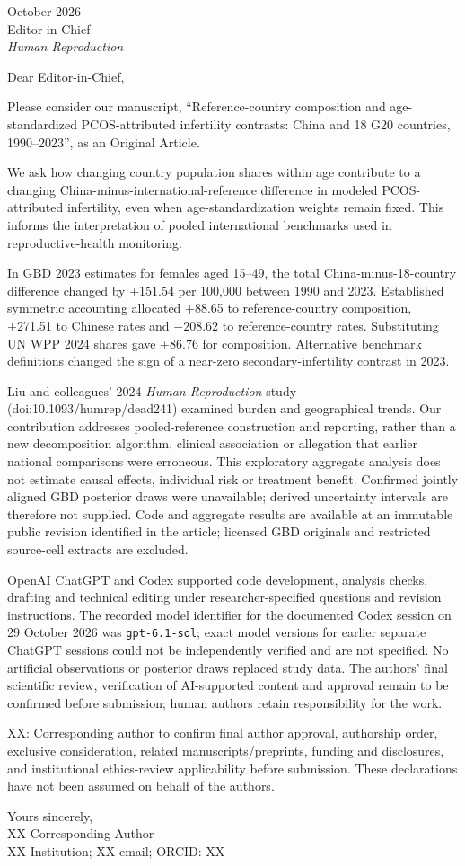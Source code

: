 \documentclass[11pt,a4paper]{article}
\begin{document}
 October 2026\\
Editor-in-Chief\\
\emph{Human Reproduction}

Dear Editor-in-Chief,

Please consider our manuscript, ``Reference-country composition and age-standardized PCOS-attributed infertility contrasts: China and 18 G20 countries, 1990--2023'', as an Original Article.

We ask how changing country population shares within age contribute to a changing China-minus-international-reference difference in modeled PCOS-attributed infertility, even when age-standardization weights remain fixed. This informs the interpretation of pooled international benchmarks used in reproductive-health monitoring.

In GBD 2023 estimates for females aged 15--49, the total China-minus-18-country difference changed by +151.54 per 100,000 between 1990 and 2023. Established symmetric accounting allocated +88.65 to reference-country composition, +271.51 to Chinese rates and $-208.62$ to reference-country rates. Substituting UN WPP 2024 shares gave +86.76 for composition. Alternative benchmark definitions changed the sign of a near-zero secondary-infertility contrast in 2023.

Liu and colleagues' 2024 \emph{Human Reproduction} study (doi:10.1093/humrep/dead241) examined burden and geographical trends. Our contribution addresses pooled-reference construction and reporting, rather than a new decomposition algorithm, clinical association or allegation that earlier national comparisons were erroneous. This exploratory aggregate analysis does not estimate causal effects, individual risk or treatment benefit. Confirmed jointly aligned GBD posterior draws were unavailable; derived uncertainty intervals are therefore not supplied. Code and aggregate results are available at an immutable public revision identified in the article; licensed GBD originals and restricted source-cell extracts are excluded.

OpenAI ChatGPT and Codex supported code development, analysis checks, drafting and technical editing under researcher-specified questions and revision instructions. The recorded model identifier for the documented Codex session on 29 October 2026 was \texttt{gpt-6.1-sol}; exact model versions for earlier separate ChatGPT sessions could not be independently verified and are not specified. No artificial observations or posterior draws replaced study data. The authors' final scientific review, verification of AI-supported content and approval remain to be confirmed before submission; human authors retain responsibility for the work.

XX: Corresponding author to confirm final author approval, authorship order, exclusive consideration, related manuscripts/preprints, funding and disclosures, and institutional ethics-review applicability before submission. These declarations have not been assumed on behalf of the authors.

Yours sincerely,\\
XX Corresponding Author\\
XX Institution; XX email; ORCID: XX
\end{document}
